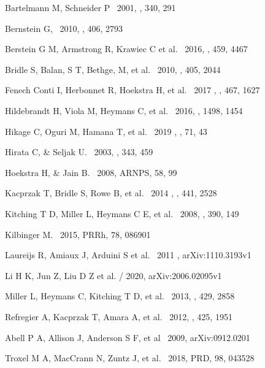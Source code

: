 \documentclass[twocolumn]{aastex62}
\begin{document}
\begin{thebibliography}{}
Bartelmann M, Schneider P \ 2001, \physrep, 340, 291

Bernstein G, \ 2010, \mnras, 406, 2793 

Berstein G M, Armstrong R, Krawiec C et al. \ 2016, \mnras, 459, 4467
 
Bridle S, Balan, S T, Bethge, M, et al. \ 2010, \mnras, 405, 2044

Fenech Conti I, Herbonnet R, Hoekstra H, et al. \ 2017 , \mnras,  467, 1627

Hildebrandt H, Viola M, Heymans C, et al. \ 2016, \mnras, 1498, 1454

Hikage C, Oguri M, Hamana T, et al. \ 2019 , \pasj, 71, 43

Hirata C, \& Seljak U. \ 2003,  \mnras,  343, 459

Hoekstra H, \& Jain B. \ 2008, ARNPS, 58, 99

Kacprzak T, Bridle S, Rowe B, et al. \ 2014 , \mnras, 441, 2528

Kitching T D, Miller L, Heymans C E, et al. \ 2008, \mnras, 390, 149

Kilbinger M. \ 2015,  PRRh, 78, 086901

Laureijs R, Amiaux J, Arduini S et al. \ 2011 , arXiv:1110.3193v1

Li H K, Jun Z, Liu D Z et al. / 2020,  arXiv:2006.02095v1

Miller L, Heymans C, Kitching T D, et al. \ 2013,  \mnras, 429, 2858

Refregier A, Kacprzak T, Amara A, et al.  \ 2012, \mnras, 425, 1951

Abell P A, Allison J, Anderson S F, et al \ 2009, arXiv:0912.0201 

Troxel M A, MacCrann N, Zuntz J, et al. \ 2018, PRD, 98, 043528


\end{thebibliography}
\end{document}

